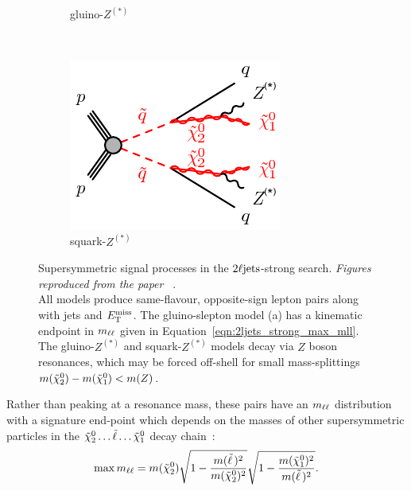 \begin{figure}[tp]
\begin{subfigure}{0.47\textwidth}
\caption{gluino-$Z^{(*)}$}
\end{subfigure}
\\[0.5em]
\begin{subfigure}{0.48\textwidth}
\centering
\includegraphics[width=\textwidth]{figures/2ljets_strong_sqsq_qqZZN1N1.pdf}
\caption{squark-$Z^{(*)}$}
\end{subfigure}
\caption[
Supersymmetric signal processes in the $\twoljets$-strong search
]{%
Supersymmetric signal processes in the $\twoljets$-strong search.
\emph{Figures reproduced from the paper%
}~\cite{atlas2022searches, atlas_susy_feynman}.
\\[0.5em]
All models produce same-flavour, opposite-sign lepton pairs along with jets
and $E_\mathrm{T}^\mathrm{miss}$.
The gluino-slepton model (a) has a kinematic endpoint in $m_{\ell\ell}$
given in Equation~\ref{eqn:2ljets_strong_max_mll}.
The gluino-$Z^{(*)}$ and squark-$Z^{(*)}$ models decay via $Z$ boson
resonances, which may be forced off-shell for small mass-splittings
$m(\tilde\chi^0_2) - m(\tilde\chi^0_1) < m(Z)$.
}
\label{fig:2ljets_strong_signal_diagrams}
\end{figure}

Rather than peaking at a resonance mass, these pairs have an $m_{\ell\ell}$
distribution with a signature end-point which depends on the masses of other
supersymmetric particles in the
$\tilde\chi^0_2 \ldots \tilde\ell \ldots \tilde\chi^0_1$
decay chain~\cite{paige1996determining}:
\begin{equation}
\label{eqn:2ljets_strong_max_mll}
\max m_{\ell\ell}
= m(\tilde\chi^0_2)
\sqrt{1 - \frac{m(\tilde\ell\,)^2}{m(\tilde\chi^0_2)^2}}
\sqrt{1 - \frac{m(\tilde\chi^0_1)^2}{m(\tilde\ell\,)^2}}
.
\end{equation}

